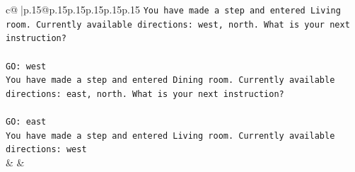 \documentclass{article}
\begin{document}
{\begin{supertabular}{c@{$\;$}|p{.15\linewidth}@{}p{.15\linewidth}p{.15\linewidth}p{.15\linewidth}p{.15\linewidth}p{.15\linewidth}}
{{{\texttt{You have made a step and entered Living room. Currently available directions: west, north. What is your next instruction?  } \\
\\ 
\texttt{GO: west  } \\
\texttt{You have made a step and entered Dining room. Currently available directions: east, north. What is your next instruction?  } \\
\\ 
\texttt{GO: east  } \\
\texttt{You have made a step and entered Living room. Currently available directions: west} \\
            }
        }
    }
    & & \\ \\


\end{supertabular}}
\end{document}
